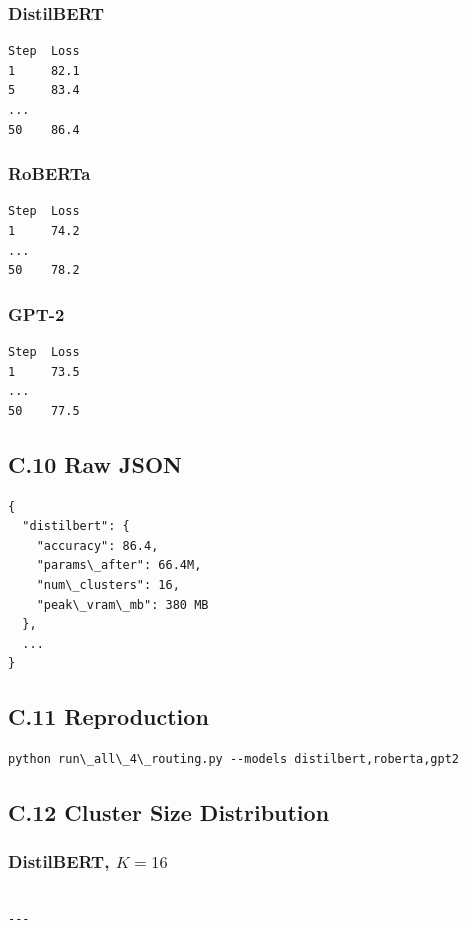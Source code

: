 \subsubsection{DistilBERT}

\begin{lstlisting}
Step  Loss
1     82.1
5     83.4
...
50    86.4
\end{lstlisting}

\subsubsection{RoBERTa}

\begin{lstlisting}
Step  Loss
1     74.2
...
50    78.2
\end{lstlisting}

\subsubsection{GPT-2}

\begin{lstlisting}
Step  Loss
1     73.5
...
50    77.5
\end{lstlisting}

\subsection{C.10 Raw JSON}

\begin{lstlisting}
{
  "distilbert": {
    "accuracy": 86.4,
    "params\_after": 66.4M,
    "num\_clusters": 16,
    "peak\_vram\_mb": 380 MB
  },
  ...
}
\end{lstlisting}

\subsection{C.11 Reproduction}

\begin{lstlisting}
python run\_all\_4\_routing.py --models distilbert,roberta,gpt2
\end{lstlisting}

\subsection{C.12 Cluster Size Distribution}

\subsubsection{DistilBERT, $K=16$}

\begin{lstlisting}

---
\end{lstlisting}